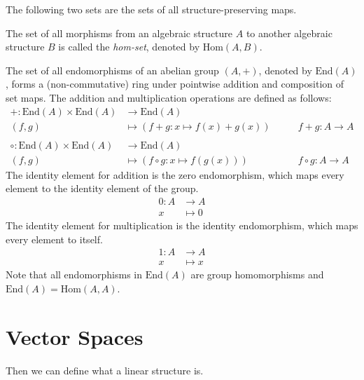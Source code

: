 \documentclass[
	11pt, %
	fleqn, %
	a4paper, %
]{LegrandOrangeBook}
\newcommand{\End}[1]{\text{End}(#1)} %
\newcommand{\Hom}[2]{\text{Hom}(#1, #2)} %
\begin{document}
The following two sets are the sets of all structure-preserving maps.

\begin{definition}
    The set of all morphisms from an algebraic structure $A$ to another algebraic structure $B$ is called the \emph{hom-set}, denoted by $\Hom{A}{B}$. 
\end{definition}

\begin{definition}
    The set of all endomorphisms of an abelian group $(A, +)$, denoted by $\End{A}$, forms a (non-commutative) ring under pointwise addition and composition of set maps. The addition and multiplication operations are defined as follows:
    \[
        \begin{split}
            + : \End{A} \times \End{A} &\to \End{A} \\
            (f,g) &\mapsto (f+g: x \mapsto f(x) + g(x)) \qquad &f + g : A \to A \\ \\
            \circ : \End{A} \times \End{A} &\to \End{A} \\
            (f,g) &\mapsto (f \circ g: x \mapsto f(g(x))) \qquad &f \circ g : A \to A
        \end{split}
    \]
    The identity element for addition is the zero endomorphism, which maps every element to the identity element of the group. 
    \[ \begin{split}
        0: A &\to A \\
        x &\mapsto 0
    \end{split}
    \]
    The identity element for multiplication is the identity endomorphism, which maps every element to itself. 
    \[
    \begin{split}
        1: A &\to A \\
        x &\mapsto x
    \end{split}
    \]
    Note that all endomorphisms in $\End{A}$ are group homomorphisms and $\End{A} = \Hom{A}{A}$.
\end{definition}

\newpage

\section{Vector Spaces}

Then we can define what a linear structure is.
\end{document}
